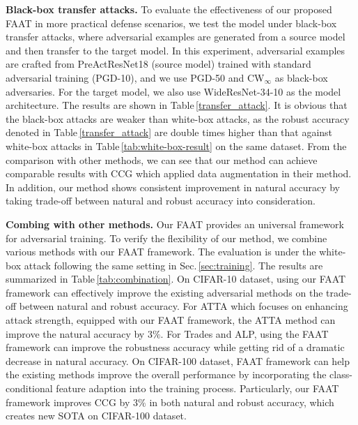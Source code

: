 \documentclass[10pt,twocolumn,letterpaper]{article}
\begin{document}
	
\vspace{5pt}
\noindent\textbf{Black-box transfer attacks.} To evaluate the effectiveness of our proposed FAAT in more practical defense scenarios, we test the model under black-box transfer attacks, where adversarial examples are generated from a source model and then transfer to the target model. In this experiment, adversarial examples are crafted from PreActResNet18 (source model) trained with standard adversarial training (PGD-10), and we use PGD-50 and CW$_{\infty}$ as black-box adversaries. For the target model, we also use WideResNet-34-10 as the model architecture. The results are shown in Table\,\ref{transfer_attack}. It is obvious that the black-box attacks are weaker than white-box attacks, as the robust accuracy denoted in Table\,\ref{transfer_attack} are double times higher than that against white-box attacks in Table\,\ref{tab:white-box-result} on the same dataset. From the comparison with other methods, we can see that our method can achieve comparable results with CCG which applied data augmentation in their method. In addition, our method shows consistent improvement in natural accuracy by taking trade-off between natural and robust accuracy into consideration.

\vspace{5pt}
\noindent\textbf{Combing with other methods.} Our FAAT provides an universal framework for adversarial training. To verify the flexibility of our method, we combine various methods with our FAAT framework. The evaluation is under the white-box attack following the same setting in Sec.\,\ref{sec:training}. The results are summarized in Table\,\ref{tab:combination}. On CIFAR-10 dataset, using our FAAT framework can effectively improve the existing adversarial methods on the trade-off between natural and robust accuracy. For ATTA which focuses on enhancing attack strength, equipped with our FAAT framework, the ATTA method can improve the natural accuracy by $3\%$. For Trades and ALP, using the FAAT framework can improve the robustness accuracy while getting rid of a dramatic decrease in natural accuracy. On CIFAR-100 dataset, FAAT framework can help the existing methods improve the overall performance by incorporating the class-conditional feature adaption into the training process. Particularly, our FAAT framework improves CCG by $3\%$ in both natural and robust accuracy, which creates new SOTA on CIFAR-100 dataset.
\end{document}
